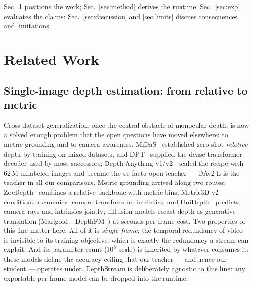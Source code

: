 \documentclass[10pt,twocolumn]{article}
\begin{document}
Sec.~\ref{sec:related} positions the work;
Sec.~\ref{sec:method} derives the runtime;
Sec.~\ref{sec:exp} evaluates the claims;
Sec.~\ref{sec:discussion} and \ref{sec:limits} discuss consequences and
limitations.

\section{Related Work}
\label{sec:related}

\subsection{Single-image depth estimation: from relative to metric}
Cross-dataset generalization, once the central obstacle of monocular depth,
is now a solved enough problem that the open questions have moved elsewhere:
to metric grounding and to camera awareness. MiDaS~\cite{midas} established
zero-shot \emph{relative} depth by training on mixed datasets, and
DPT~\cite{dpt} supplied the dense transformer decoder used by most
successors; Depth Anything v1/v2~\cite{da1,dav2} scaled the recipe with
62\,M unlabeled images and became the de-facto open teacher --- DAv2-L is
the teacher in all our comparisons. Metric grounding arrived along two
routes: ZoeDepth~\cite{zoedepth} combines a relative backbone with metric
bins, Metric3D v2~\cite{metric3d} conditions a canonical-camera transform
on intrinsics, and UniDepth~\cite{unidepth} predicts camera rays and
intrinsics jointly; diffusion models recast depth as generative translation
(Marigold~\cite{marigold}, DepthFM~\cite{depthfm}) at seconds-per-frame
cost. Two properties of this line matter here. All of it is
\emph{single-frame}: the temporal redundancy of video is invisible to its
training objective, which is exactly the redundancy a stream can exploit.
And its parameter count ($10^8$ scale) is inherited by whatever consumes
it: these models define the accuracy ceiling that our teacher --- and hence
our student --- operates under. DepthStream is deliberately agnostic to
this line: any exportable per-frame model can be dropped into the runtime.
\end{document}
